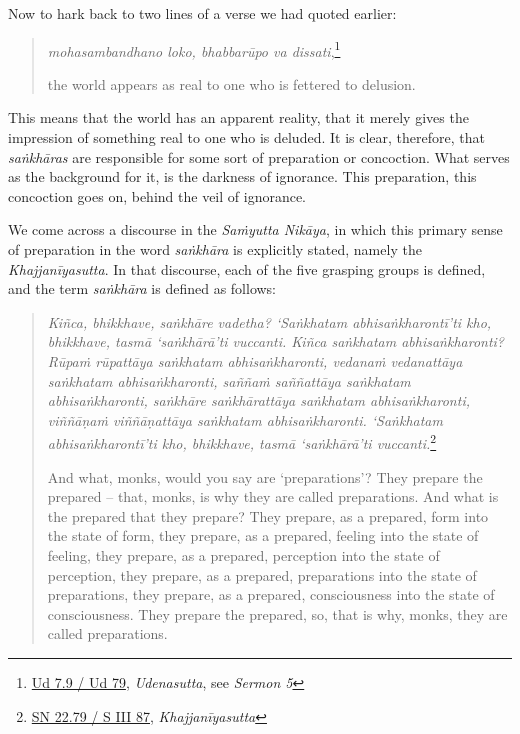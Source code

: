 Now to hark back to two lines of a verse we had quoted earlier:

\begin{quote}
\emph{mohasambandhano loko, bhabbarūpo va dissati},\footnote{\href{https://suttacentral.net/ud7.9/pli/ms}{Ud 7.9 / Ud 79}, \emph{Udenasutta}, see \emph{Sermon 5}}

the world appears as real to one who is fettered to delusion.
\end{quote}

This means that the world has an apparent reality, that it merely gives the impression of something real to one who is deluded. It is clear, therefore, that \emph{saṅkhāras} are responsible for some sort of preparation or concoction. What serves as the background for it, is the darkness of ignorance. This preparation, this concoction goes on, behind the veil of ignorance.

We come across a discourse in the \emph{Saṁyutta Nikāya}, in which this primary sense of preparation in the word \emph{saṅkhāra} is explicitly stated, namely the \emph{Khajjanīyasutta}. In that discourse, each of the five grasping groups is defined, and the term \emph{saṅkhāra} is defined as follows:

\clearpage

\begin{quote}
\emph{Kiñca, bhikkhave, saṅkhāre vadetha? `Saṅkhatam abhisaṅkharontī'ti kho, bhikkhave, tasmā `saṅkhārā'ti vuccanti. Kiñca saṅkhatam abhisaṅkharonti? Rūpaṁ rūpattāya saṅkhatam abhisaṅkharonti, vedanaṁ vedanattāya saṅkhatam abhisaṅkharonti, saññaṁ saññattāya saṅkhatam abhisaṅkharonti, saṅkhāre saṅkhārattāya saṅkhatam abhisaṅkharonti, viññāṇaṁ viññāṇattāya saṅkhatam abhisaṅkharonti. `Saṅkhatam abhisaṅkharontī'ti kho, bhikkhave, tasmā `saṅkhārā'ti vuccanti.}\footnote{\href{https://suttacentral.net/sn22.79/pli/ms}{SN 22.79 / S III 87}, \emph{Khajjanīyasutta}}

And what, monks, would you say are `preparations'? They prepare the prepared -- that, monks, is why they are called preparations. And what is the prepared that they prepare? They prepare, as a prepared, form into the state of form, they prepare, as a prepared, feeling into the state of feeling, they prepare, as a prepared, perception into the state of perception, they prepare, as a prepared, preparations into the state of preparations, they prepare, as a prepared, consciousness into the state of consciousness. They prepare the prepared, so, that is why, monks, they are called preparations.
\end{quote}


